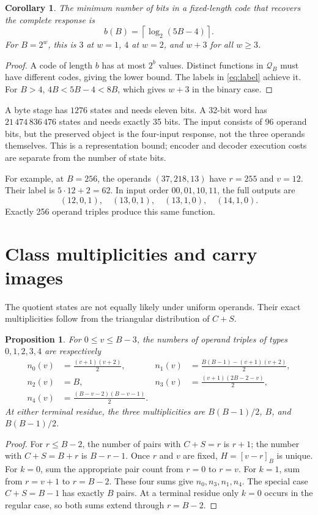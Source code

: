 \documentclass[11pt,a4paper]{article}
\newtheorem{proposition}[theorem]{Proposition}
\newtheorem{corollary}[theorem]{Corollary}
\theoremstyle{definition}\newtheorem{definition}[theorem]{Definition}
\newcommand{\Q}{\mathcal Q_B}
\begin{document}
\begin{corollary}\label{cor:bits}
The minimum number of bits in a fixed-length code that recovers the
complete response is
\[
 b(B)=\left\lceil\log_2(5B-4)\right\rceil.
\]
For $B=2^w$, this is $3$ at $w=1$, $4$ at $w=2$, and $w+3$ for
all $w\geq3$.
\end{corollary}
\begin{proof}
A code of length $b$ has at most $2^b$ values. Distinct functions in
$\Q$ must have different codes, giving the lower bound.
The labels in \eqref{eq:label} achieve it. For $B>4$,
$4B<5B-4<8B$, which gives $w+3$ in the binary case.
\end{proof}

A byte stage has $1276$ states and needs eleven bits. A 32-bit word
has $21\,474\,836\,476$ states and needs exactly 35 bits.
The input consists of 96 operand bits, but the preserved object is the
four-input response, not the three operands themselves.
This is a representation bound; encoder and decoder execution costs are
separate from the number of state bits.

For example, at $B=256$, the operands $(37,218,13)$ have $r=255$
and $v=12$. Their label is $5\cdot12+2=62$. In input order
$00,01,10,11$, the full outputs are
\[
 (12,0,1),\quad(13,0,1),\quad(13,1,0),\quad(14,1,0).
\]
Exactly 256 operand triples produce this same function.

\section{Class multiplicities and carry images}
The quotient states are not equally likely under uniform operands.
Their exact multiplicities follow from the triangular distribution
of $C+S$.

\begin{proposition}\label{prop:weights}
For $0\leq v\leq B-3$, the numbers of operand triples of types
$0,1,2,3,4$ are respectively
\begin{align*}
 n_0(v)&=\frac{(v+1)(v+2)}2,&
 n_1(v)&=\frac{B(B-1)-(v+1)(v+2)}2,\\
 n_2(v)&=B,&
 n_3(v)&=\frac{(v+1)(2B-2-v)}2,\\
 n_4(v)&=\frac{(B-v-2)(B-v-1)}2.
\end{align*}
At either terminal residue, the three multiplicities are
$B(B-1)/2$, $B$, and $B(B-1)/2$.
\end{proposition}
\begin{proof}
For $r\leq B-2$, the number of pairs with $C+S=r$ is $r+1$;
the number with $C+S=B+r$ is $B-r-1$. Once $r$ and $v$ are fixed,
$H=[v-r]_B$ is unique. For $k=0$, sum the appropriate pair count
from $r=0$ to $r=v$. For $k=1$, sum from $r=v+1$ to $r=B-2$.
These four sums give $n_0,n_3,n_1,n_4$. The special case
$C+S=B-1$ has exactly $B$ pairs. At a terminal residue only $k=0$
occurs in the regular case, so both sums extend through $r=B-2$.
\end{proof}
\end{document}
